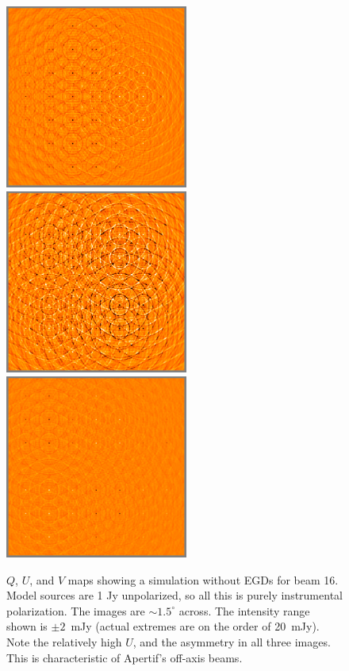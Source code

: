 \documentclass{aps2010} \special{papersize=8.5in,11in}
\begin{document}
\begin{figure}
\includegraphics[width=6cm]{q15}%
\includegraphics[width=6cm]{u15}%
\includegraphics[width=6cm]{v15}
\caption{\label{fig:quv}$Q$, $U$, and $V$ maps showing a simulation without EGDs for beam 16. Model sources are 1 Jy unpolarized, so all this is purely instrumental polarization. The images are $\sim1.5^\circ$ across. The intensity range shown is $\pm2$~mJy (actual extremes are on the order of 20~mJy). Note the relatively high $U$, and the asymmetry in all three images. This is characteristic of Apertif's off-axis beams.}
\end{figure}
\end{document}
